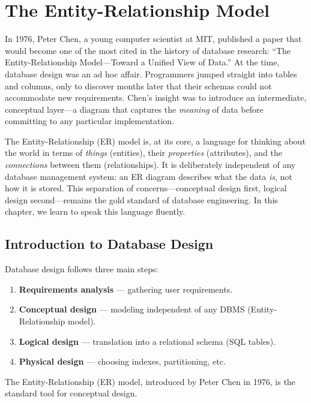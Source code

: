 \chapter{The Entity-Relationship Model}
\label{ch:er_model}

In 1976, Peter Chen, a young computer scientist at MIT, published a paper that would become one of the most cited in the history of database research: ``The Entity-Relationship Model---Toward a Unified View of Data.'' At the time, database design was an ad hoc affair. Programmers jumped straight into tables and columns, only to discover months later that their schemas could not accommodate new requirements. Chen's insight was to introduce an intermediate, conceptual layer---a diagram that captures the \emph{meaning} of data before committing to any particular implementation.

The Entity-Relationship (ER) model is, at its core, a language for thinking about the world in terms of \emph{things} (entities), their \emph{properties} (attributes), and the \emph{connections} between them (relationships). It is deliberately independent of any database management system: an ER diagram describes what the data \emph{is}, not how it is stored. This separation of concerns---conceptual design first, logical design second---remains the gold standard of database engineering. In this chapter, we learn to speak this language fluently.

\section{Introduction to Database Design}

Database design follows three main steps:
\begin{enumerate}
    \item \textbf{Requirements analysis} --- gathering user requirements.
    \item \textbf{Conceptual design} --- modeling independent of any DBMS
          (Entity-Relationship model).
    \item \textbf{Logical design} --- translation into a relational schema (SQL tables).
    \item \textbf{Physical design} --- choosing indexes, partitioning, etc.
\end{enumerate}

The Entity-Relationship (ER) model, introduced by Peter Chen in 1976, is
the standard tool for conceptual design.

